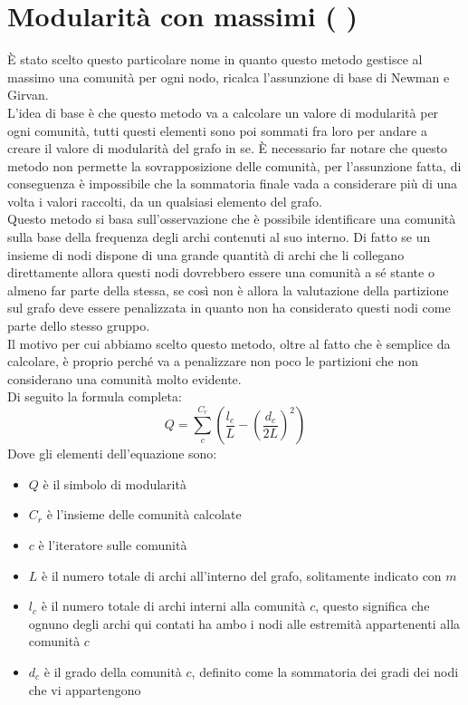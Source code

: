 \section{Modularità con massimi ( \mmax )}
È stato scelto questo particolare nome in quanto questo metodo gestisce al massimo una comunità per ogni nodo, ricalca l'assunzione di base di Newman e Girvan.\\
L'idea di base è che questo metodo va a calcolare un valore di modularità per ogni comunità, tutti questi elementi sono poi sommati fra loro per andare a creare il valore di modularità del grafo in se. È necessario far notare che questo metodo non permette la sovrapposizione delle comunità, per l'assunzione fatta, di conseguenza è impossibile che la sommatoria finale vada a considerare più di una volta i valori raccolti, da un qualsiasi elemento del grafo.\\
Questo metodo si basa sull'osservazione che è possibile identificare una comunità sulla base della frequenza degli archi contenuti al suo interno. Di fatto se un insieme di nodi dispone di una grande quantità di archi che li collegano direttamente allora questi nodi dovrebbero essere una comunità a sé stante o almeno far parte della stessa, se così non è allora la valutazione della partizione sul grafo deve essere penalizzata in quanto non ha considerato questi nodi come parte dello stesso gruppo.\\
Il motivo per cui abbiamo scelto questo metodo, oltre al fatto che è semplice da calcolare, è proprio perché va a penalizzare non poco le partizioni che non considerano una comunità molto evidente.\\
Di seguito la formula completa:
\begin{equation}
	Q=\sum_{c}^{C_r} \left( \frac{l_c}{L}-\left(\frac{d_c}{2L} \right)^2 \right)
	\label{eq:m_max}
\end{equation}
Dove gli elementi dell'equazione sono:
\begin{itemize}
	\item $Q$ è il simbolo di modularità
	\item $C_r$ è l'insieme delle comunità calcolate
	\item $c$ è l'iteratore sulle comunità
	\item $L$ è il numero totale di archi all'interno del grafo, solitamente indicato con $m$
	\item $l_c$ è il numero totale di archi interni alla comunità $c$, questo significa che ognuno degli archi qui contati ha ambo i nodi alle estremità appartenenti alla comunità $c$
	\item $d_c$ è il grado della comunità $c$, definito come la sommatoria dei gradi dei nodi che vi appartengono
\end{itemize}
